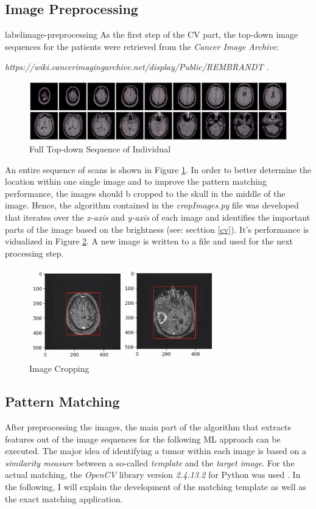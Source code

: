 \documentclass[twoside,11pt]{article}
\begin{document}
\subsection{Image Preprocessing}
label{image-preprocessing}
As the first step of the CV part, the top-down image sequences for the patients were retrieved from the \textit{Cancer Image Archive}:

 \textit{https://wiki.cancerimagingarchive.net/display/Public/REMBRANDT} .
 
 
 \begin{figure}
 	\label{fig:full-sequence}
 	\centering
 	\includegraphics[width=15cm]{full-sequence}
 	\caption{Full Top-down Sequence of Individual}
 \end{figure}%
 
 
An entire sequence of scans is shown in Figure \ref{fig:full-sequence}.
In order to better determine the location within one single image and to improve the pattern matching performance, the images should b cropped to the skull in the middle of the image. Hence, the algorithm contained in the \textit{cropImages.py} file was developed that iterates over the \textit{x-axis} and \textit{y-axis} of each image and identifies the important parts of the image based on the brightness (see: secttion \ref{cv}). It's performance is vidualized in Figure \ref{fig:crop-image}. A new image is written to a file and used for the next processing step.

\begin{figure}
	\label{fig:crop-image}
	\centering
	\includegraphics[height=4cm]{crop-image}
	\caption{Image Cropping}
\end{figure}%

\subsection{Pattern Matching}
After preprocessing the images, the main part of the algorithm that extracts features out of the image sequences for the following ML approach can be executed. The major idea of identifying a tumor within each image is based on a \textit{similarity measure} between a so-called \textit{template} and the \textit{target image}. For the actual matching, the \textit{OpenCV} library version \textit{2.4.13.2} for Python was used \citep{opencv}. 
In the following, I will explain the development of the matching template as well as the exact matching application.
\end{document}
